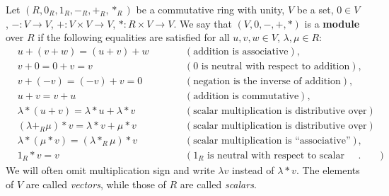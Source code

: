 \begin{definition}
  Let
    $(R, 0_R, 1_R, -_R, +_R, *_R)$ be a commutative ring with unity,
    $V$ be a set,
    $0 \in V$,
    $- \colon V \to V$,
    $+ \colon V \times V \to V$,
    $* \colon R \times V \to V$.
  We say that $(V, 0, -, + , *)$ is a \textbf{module} over $R$
  if the following equalities are satisfied
  for all $u, v, w \in V$, $\lambda, \mu \in R$:
  \begin{subequations}
    \begin{alignat}{2}
      & u + (v + w) = (u + v) + w \qquad
      && (\text{addition is associative}), \\
      & v + 0 = 0 + v = v \qquad
      && (\text{$0$ is neutral with respect to addition}), \\
      & v + (- v) = (- v) + v = 0 \qquad
      && (\text{negation is the inverse of addition}), \\
      & u + v = v + u \qquad
      && (\text{addition is commutative}), \\
      & \lambda * (u + v) = \lambda * u + \lambda * v \qquad
      && (\text{scalar multiplication is distributive over vector addition}), \\
      & (\lambda +_R \mu) * v = \lambda * v + \mu * v \qquad
      && (\text{scalar multiplication is distributive over scalar addition}), \\
      & \lambda * (\mu * v) = (\lambda *_R \mu) * v \qquad
      && (\text{scalar multiplication is ``associative''}), \\
      & 1_R * v = v \qquad
      && (\text{$1_R$ is neutral with respect to scalar multiplication}).
    \end{alignat}
  \end{subequations}
  We will often omit multiplication sign and write $\lambda v$ instead of
  $\lambda * v$.
  The elements of $V$ are called \textit{vectors}, while those of $R$ are called
  \textit{scalars}.
\end{definition}
